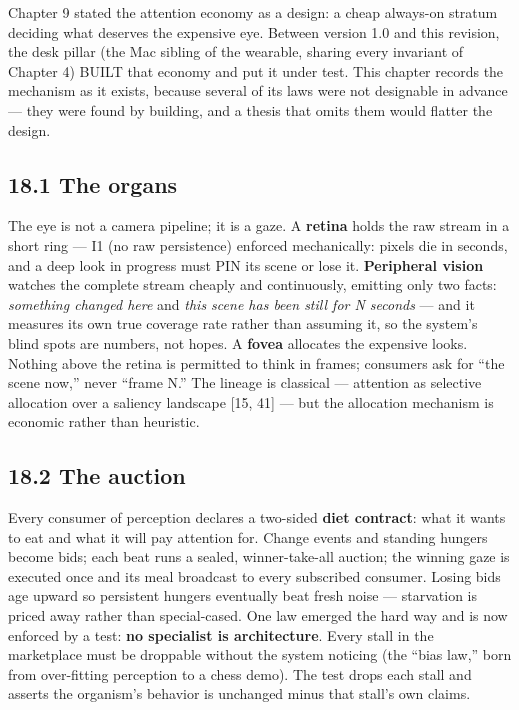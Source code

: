 Chapter 9 stated the attention economy as a design: a cheap always-on stratum
deciding what deserves the expensive eye. Between version 1.0 and this
revision, the desk pillar (the Mac sibling of the wearable, sharing every
invariant of Chapter 4) BUILT that economy and put it under test. This chapter
records the mechanism as it exists, because several of its laws were not
designable in advance --- they were found by building, and a thesis that omits
them would flatter the design.

\subsection{18.1 The organs}\label{the-organs}

The eye is not a camera pipeline; it is a gaze. A \textbf{retina} holds the raw
stream in a short ring --- I1 (no raw persistence) enforced mechanically: pixels
die in seconds, and a deep look in progress must PIN its scene or lose it.
\textbf{Peripheral vision} watches the complete stream cheaply and continuously,
emitting only two facts: \emph{something changed here} and \emph{this scene has been
still for N seconds} --- and it measures its own true coverage rate rather than
assuming it, so the system's blind spots are numbers, not hopes. A \textbf{fovea}
allocates the expensive looks. Nothing above the retina is permitted to think
in frames; consumers ask for ``the scene now,'' never ``frame N.'' The lineage is
classical --- attention as selective allocation over a saliency landscape {[}15,
41{]} --- but the allocation mechanism is economic rather than heuristic.

\subsection{18.2 The auction}\label{the-auction}

Every consumer of perception declares a two-sided \textbf{diet contract}: what it
wants to eat and what it will pay attention for. Change events and standing
hungers become bids; each beat runs a sealed, winner-take-all auction; the
winning gaze is executed once and its meal broadcast to every subscribed
consumer. Losing bids age upward so persistent hungers eventually beat fresh
noise --- starvation is priced away rather than special-cased. One law emerged
the hard way and is now enforced by a test: \textbf{no specialist is architecture}.
Every stall in the marketplace must be droppable without the system noticing
(the ``bias law,'' born from over-fitting perception to a chess demo). The test
drops each stall and asserts the organism's behavior is unchanged minus that
stall's own claims.


